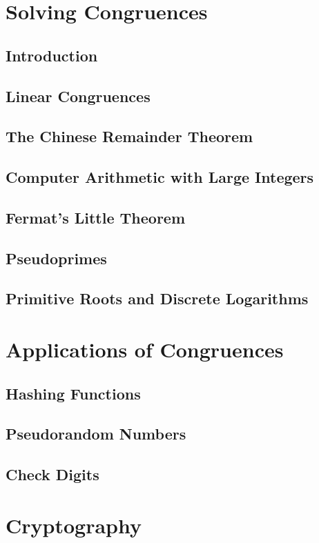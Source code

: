 \documentclass[11pt]{book}
\begin{document}
 \section{Solving Congruences}
  \subsection{Introduction}
  \subsection{Linear Congruences}
  \subsection{The Chinese Remainder Theorem}
  \subsection{Computer Arithmetic with Large Integers}
  \subsection{Fermat's Little Theorem}
  \subsection{Pseudoprimes}
  \subsection{Primitive Roots and Discrete Logarithms}
  
 \section{Applications of Congruences}
  \subsection{Hashing Functions}
  \subsection{Pseudorandom Numbers}
  \subsection{Check Digits}
  
 \section{Cryptography}
\end{document}
